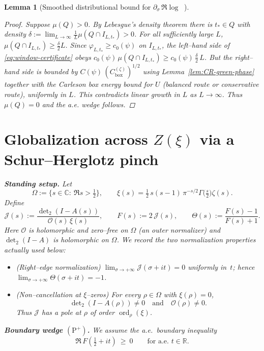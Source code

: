\documentclass[11pt]{article}
\newtheorem{lemma}[theorem]{Lemma}
\theoremstyle{definition}
\theoremstyle{remark}
\DeclareMathOperator{\dettwo}{det_2}
\begin{document}
\begin{lemma}[Smoothed distributional bound for $\partial_\sigma\,\Re\log\dettwo$]
\begin{proof}
Suppose $\mu(Q)>0$. By Lebesgue's density theorem there is $t_\ast\in Q$ with density
$\delta := \lim_{L\to\infty}\frac{1}{L}\mu(Q\cap I_{L,t_\ast})>0$. For all sufficiently large $L$, $\mu(Q\cap I_{L,t_\ast})\ge \tfrac{\delta}{2} L$. Since $\varphi_{L,t_\ast}\ge c_0(\psi)$ on $I_{L,t_\ast}$, the left–hand side of \eqref{eq:window-certificate} obeys $c_0(\psi)\,\mu(Q\cap I_{L,t_\ast}) \ge c_0(\psi)\,\tfrac{\delta}{2}\,L$. But the right–hand side is bounded by $C(\psi)\,(C_{\mathrm{box}}^{(\zeta)})^{1/2}$ using Lemma~\ref{lem:CR-green-phase} together with the Carleson box energy bound for $U$ (balanced route or conservative route), uniformly in $L$. This contradicts linear growth in $L$ as $L\to\infty$. Thus $\mu(Q)=0$ and the a.e. wedge follows.
\end{proof}

\section{Globalization across $Z(\xi)$ via a Schur--Herglotz pinch}\label{sec:globalization}

\noindent\textbf{Standing setup.}
Let
\[
\Omega:=\{s\in\mathbb C:\ \Re s>\tfrac12\},\qquad
\xi(s)=\tfrac12\,s(s-1)\,\pi^{-s/2}\Gamma\!\big(\tfrac s2\big)\zeta(s).
\]
Define
\[
\mathcal J(s):=\frac{\det\nolimits_2(I-A(s))}{\mathcal O(s)\,\xi(s)},\qquad
F(s):=2\,\mathcal J(s),\qquad
\Theta(s):=\frac{F(s)-1}{F(s)+1}.
\]
Here $\mathcal O$ is holomorphic and zero--free on $\Omega$ (an outer normalizer) and
$\det\nolimits_2(I-A)$ is holomorphic on $\Omega$.
We record the two normalization properties actually used below:
\begin{itemize}
\item[(N1)] (\emph{Right--edge normalization}) $\displaystyle\lim_{\sigma\to+\infty}\mathcal J(\sigma+it)=0$ uniformly in~$t$; hence $\displaystyle\lim_{\sigma\to+\infty}\Theta(\sigma+it)=-1$.
\item[(N2)] (\emph{Non--cancellation at $\xi$--zeros}) For every $\rho\in\Omega$ with $\xi(\rho)=0$,
\[
\det\nolimits_2(I-A(\rho))\neq0\quad\text{and}\quad \mathcal O(\rho)\neq0.
\]
Thus $\mathcal J$ has a pole at $\rho$ of order $\operatorname{ord}_\rho(\xi)$.
\end{itemize}

\noindent\textbf{Boundary wedge $(\mathrm{P}^+)$.}
We assume the a.e.\ boundary inequality
\[
\Re\,F\!\left(\tfrac12+it\right)\ \ge\ 0\qquad\text{for a.e.\ }t\in\mathbb R.
\tag{P+}
\label{eq:Pplus}
\]


\end{lemma}
\end{document}
